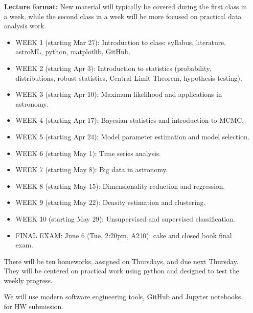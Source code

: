 \documentclass[10pt]{article}
\begin{document}
{\bf Lecture format:}
New material will typically be covered during the first class in a week, while
the second class in a week will be more focused on practical data analysis work. 

\newpage 
\begin{itemize}
\item WEEK 1 (starting Mar 27): 
      Introduction to class: syllabus, literature, astroML, python, matplotlib, GitHub. 
      
\item WEEK  2 (starting Apr 3): Introduction to statistics (probability, distributions, 
             robust statistics, Central Limit Theorem,  hypothesis testing).

\item WEEK  3 (starting Apr 10):  Maximum likelihood and applications in astronomy.

\item WEEK  4 (starting Apr 17):  Bayesian statistics and introduction to MCMC.

\item WEEK  5 (starting Apr 24):  Model parameter estimation and model selection.

\item WEEK  6 (starting May 1):   Time series analysis.

\item WEEK  7 (starting May 8):   Big data in astronomy.

\item WEEK  8 (starting May 15): Dimensionality reduction and regression.

\item WEEK  9 (starting May 22):  Density estimation and clustering.

\item WEEK  10 (starting May 29):  Unsupervised and supervised classification.

\item FINAL EXAM: June 6 (Tue, 2:20pm, A210): cake and closed book final exam.

\end{itemize}


\vskip 0.2in


There will be ten homeworks, assigned on Thursdays, and due next Thursday. They will
be centered on practical work using python and designed to test the weekly progress. 

We will use modern software engineering tools, GitHub and Jupyter notebooks for HW submission. 
\end{document}
